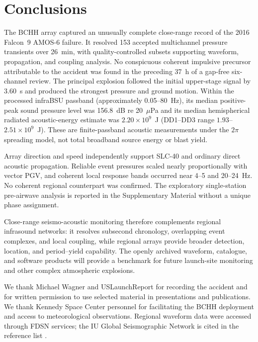 \documentclass[]{seismica}
\begin{document}
\section{Conclusions}
\label{sec:conclusions}

The BCHH array captured an unusually complete close-range record of the 2016
Falcon~9 AMOS-6 failure. It resolved 153 accepted multichannel pressure
transients over 26~min, with quality-controlled subsets supporting waveform,
propagation, and coupling analysis. No conspicuous coherent impulsive precursor
attributable to the accident was found in the preceding 37~h of a gap-free six-channel
review. The principal explosion followed
the initial upper-stage signal by 3.60~s and produced the strongest pressure
and ground motion. Within the processed infraBSU passband (approximately
0.05--80~Hz), its median positive-peak sound pressure level was 156.8~dB re
20~$\mu$Pa and its median hemispherical radiated acoustic-energy estimate was
$2.20\times10^9$~J (DD1--DD3 range $1.93$--$2.51\times10^9$~J). These are
finite-passband acoustic measurements under the $2\pi$ spreading model, not
total broadband source energy or blast yield.

Array direction and speed independently support SLC-40 and ordinary direct
acoustic propagation. Reliable event pressures scaled nearly proportionally
with vector PGV, and coherent local response bands occurred near 4--5 and
20--24~Hz. No coherent regional counterpart was confirmed. The exploratory
single-station pre-airwave analysis is reported in the Supplementary Material
without a unique phase assignment.

Close-range seismo-acoustic monitoring therefore complements regional
infrasound networks: it resolves subsecond chronology, overlapping event
complexes, and local coupling, while regional arrays provide broader detection,
location, and period--yield capability. The openly archived waveform,
catalogue, and software products will provide a benchmark for future
launch-site monitoring and other complex atmospheric explosions.

\begin{acknowledgements}
We thank Michael Wagner and USLaunchReport for recording the accident and for
written permission to use selected material in presentations and publications.
We thank Kennedy Space Center personnel for facilitating the BCHH deployment
and access to meteorological observations. Regional waveform data were
accessed through FDSN services; the IU Global Seismographic Network is cited
in the reference list \citep{asl_gsn_iu_1988}.
\end{acknowledgements}
\end{document}
